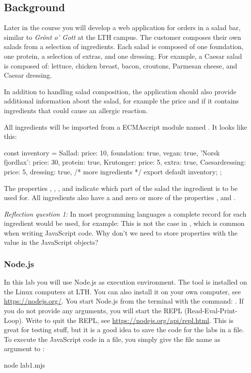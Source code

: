 \documentclass[fleqn, article, a4paper]{memoir}
\begin{document}
\subsection*{Background}

Later in the course you will develop a web application for orders in a salad bar, similar to \emph{Grönt o' Gott} at the LTH campus. The customer composes their own salads from a selection of ingredients. Each salad is composed of one foundation, one protein, a selection of extras, and one dressing. For example, a Caesar salad is composed of: lettuce, chicken breast, bacon, croutons, Parmesan cheese, and Caesar dressing.

In addition to handling salad composition, the application should also provide additional information about the salad, for example the price and if it contains ingredients that could cause an allergic reaction.

\noindent All ingredients will be imported from a ECMAscript module named . It looks like this:
\begin{Code}
const inventory = {
  Sallad: {price: 10, foundation: true, vegan: true}, 
  'Norsk fjordlax': {price: 30, protein: true},
  Krutonger: {price: 5, extra: true},
  Caesardressing: {price: 5, dressing: true},
  /* more ingredients */
  export default inventory;
};
\end{Code}
\noindent The properties , , , and  indicate which part of the salad the ingredient is to be used for. All ingredients also have a  and zero or more of the properties ,  and .

\noindent \emph{Reflection question 1:} In most programming languages a complete record for each ingredient would be used, for example: 
This is not the case in , which is common when writing JavaScript code. Why don't we need to store properties with the value  in the JavaScript objects?


\subsubsection*{Node.js}

In this lab you will use Node.js as execution environment. The tool is installed on the Linux computers at LTH. You can also install it on your own computer, see \url{https://nodejs.org/}. You start Node.js from the terminal with the command: . If you do not provide any arguments, you will start the REPL (Read-Eval-Print-Loop). Write  to quit the REPL, see \url{https://nodejs.org/api/repl.html}. This is great for testing stuff, but it is a good idea to save the code for the labs in a file. To execute the JavaScript code in a file, you simply give the file name as argument to :
\begin{Code}
  node lab1.mjs
\end{Code}
\end{document}
